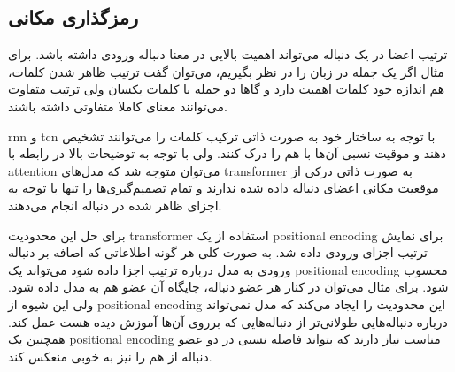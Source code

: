 \subsection{رمزگذاری مکانی}
ترتیب اعضا در یک دنباله می‌تواند اهمیت بالایی در معنا دنباله ورودی داشته باشد.
برای مثال اگر یک جمله در زبان را در نظر بگیریم، می‌توان گفت ترتیب ظاهر شدن
کلمات، هم اندازه خود کلمات اهمیت دارد و گاها دو جمله با کلمات یکسان ولی ترتیب
متفاوت می‌توانند معنای کاملا متفاوتی داشته باشند.

\gls{rnn} و \gls{tcn} با توجه به ساختار خود به صورت ذاتی ترکیب کلمات را
می‌توانند تشخیص دهند و موقیت نسبی آن‌ها با هم را درک کنند. ولی با توجه به
توضیحات بالا در رابطه با \gls{attention} می‌توان متوجه شد که مدل‌های
\gls{transformer} به صورت ذاتی درکی از موقعیت مکانی اعضای دنباله داده شده ندارند
و تمام تصمیم‌گیری‌ها را تنها با توجه به اجزای ظاهر شده در دنباله انجام می‌دهند.

برای حل این محدودیت \gls{transformer} استفاده از یک \gls{positional encoding}
برای نمایش ترتیب اجزای ورودی داده شد. به صورت کلی هر گونه اطلاعاتی که اضافه بر
دنباله ورودی به مدل درباره ترتیب اجزا داده شود می‌تواند یک \gls{positional
encoding} محسوب شود. برای مثال می‌توان در کنار هر عضو دنباله، جایگاه آن عضو هم
به مدل داده شود. ولی این شیوه از \gls{positional encoding} این محدودیت را ایجاد
می‌کند که مدل نمی‌تواند درباره دنباله‌هایی طولانی‌تر از دنباله‌هایی که برروی
آن‌ها آموزش دیده هست عمل کند. همچنین یک \gls{positional encoding} مناسب نیاز
دارند که بتواند فاصله نسبی در دو عضو دنباله از هم را نیز به خوبی منعکس کند.

